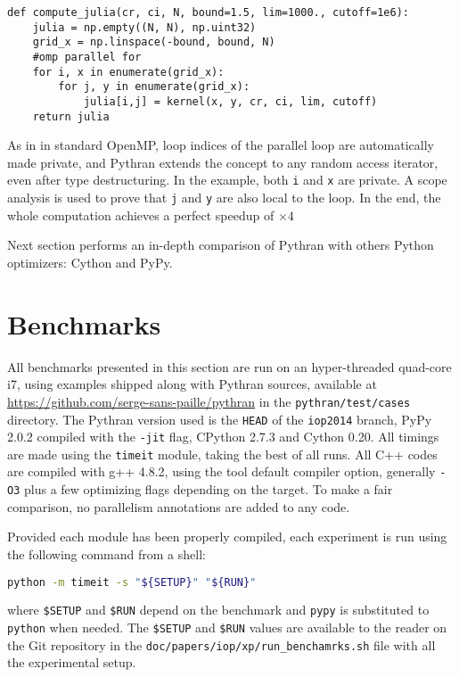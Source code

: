 \documentclass[10pt, onecolumn, preprint]{sigplanconf}
\begin{document}
\begin{lstlisting}
def compute_julia(cr, ci, N, bound=1.5, lim=1000., cutoff=1e6):
    julia = np.empty((N, N), np.uint32)
    grid_x = np.linspace(-bound, bound, N)
    #omp parallel for 
    for i, x in enumerate(grid_x):
        for j, y in enumerate(grid_x):
            julia[i,j] = kernel(x, y, cr, ci, lim, cutoff)
    return julia
\end{lstlisting}

As in in standard OpenMP, loop indices of the parallel loop are automatically
made private, and Pythran extends the concept to any random access iterator,
even after type destructuring. In the example, both \texttt{i} and \texttt{x}
are private. A scope analysis is used to prove that \texttt{j} and \texttt{y}
are also local to the loop. In the end, the whole computation achieves a
perfect speedup of $\times4$

Next section performs an in-depth comparison of Pythran with others Python
optimizers: Cython and PyPy.

\section{Benchmarks}
\label{sec:benchmarks}


All benchmarks presented in this section are run on an hyper-threaded quad-core
i7, %
using examples shipped along with
Pythran sources, available at \url{https://github.com/serge-sans-paille/pythran} in
the \texttt{pythran/test/cases} directory. The Pythran version used is the
\texttt{HEAD} of the \texttt{iop2014} branch, PyPy 2.0.2 compiled with the
\texttt{-jit} flag, CPython 2.7.3 and Cython 0.20. All timings are made using
the \texttt{timeit} module, taking the best of all runs. All C++ codes are
compiled with g++ 4.8.2, using the tool default compiler option, generally
\texttt{-O3} plus a few optimizing flags depending on the target. To make a
fair comparison, no parallelism annotations are added to any code.

Provided each module has been properly compiled, each experiment is run using
the following command from a shell:

\begin{lstlisting}[language=sh]
python -m timeit -s "${SETUP}" "${RUN}"
\end{lstlisting}

\noindent where \texttt{\$SETUP} and \texttt{\$RUN} depend on the benchmark and
\texttt{pypy} is substituted to \texttt{python} when needed. The
\texttt{\$SETUP} and \texttt{\$RUN} values are available to the reader on the
Git repository in the \texttt{doc/papers/iop/xp/run\_benchamrks.sh} file with
all the experimental setup.
\end{document}
